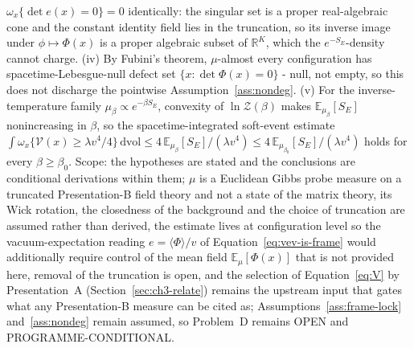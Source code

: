 \(\omega_x\{\det e(x)=0\}=0\) identically: the singular set is a proper real-algebraic cone and the constant identity field lies in the truncation, so its inverse image under \(\phi\mapsto\Phi(x)\) is a proper algebraic subset of \(\mathbb R^K\), which the \(e^{-S_E}\)-density cannot charge. (iv) By Fubini's theorem, \(\mu\)-almost every configuration has spacetime-Lebesgue-null defect set \(\{x:\det\Phi(x)=0\}\) - null, not empty, so this does not discharge the pointwise Assumption~\ref{ass:nondeg}. (v) For the inverse-temperature family \(\mu_\beta\propto e^{-\beta S_E}\), convexity of \(\ln\mathcal Z(\beta)\) makes \(\mathbb E_{\mu_\beta}[S_E]\) nonincreasing in \(\beta\), so the spacetime-integrated soft-event estimate \(\int\omega_x\{\mathcal V(x)\ge\lambda v^4/4\}\,\mathrm{dvol}\le4\,\mathbb E_{\mu_\beta}[S_E]/(\lambda v^4)\le4\,\mathbb E_{\mu_{\beta_0}}[S_E]/(\lambda v^4)\) holds for every \(\beta\ge\beta_0\). Scope: the hypotheses are stated and the conclusions are conditional derivations within them; \(\mu\) is a Euclidean Gibbs probe measure on a truncated Presentation-B field theory and not a state of the matrix theory, its Wick rotation, the closedness of the background and the choice of truncation are assumed rather than derived, the estimate lives at configuration level so the vacuum-expectation reading \(e=\langle\Phi\rangle/v\) of Equation~\eqref{eq:vev-is-frame} would additionally require control of the mean field \(\mathbb E_\mu[\Phi(x)]\) that is not provided here, removal of the truncation is open, and the selection of Equation~\eqref{eq:V} by Presentation~A (Section~\ref{sec:ch3-relate}) remains the upstream input that gates what any Presentation-B measure can be cited as; Assumptions~\ref{ass:frame-lock} and~\ref{ass:nondeg} remain assumed, so Problem~D remains OPEN and PROGRAMME-CONDITIONAL.


